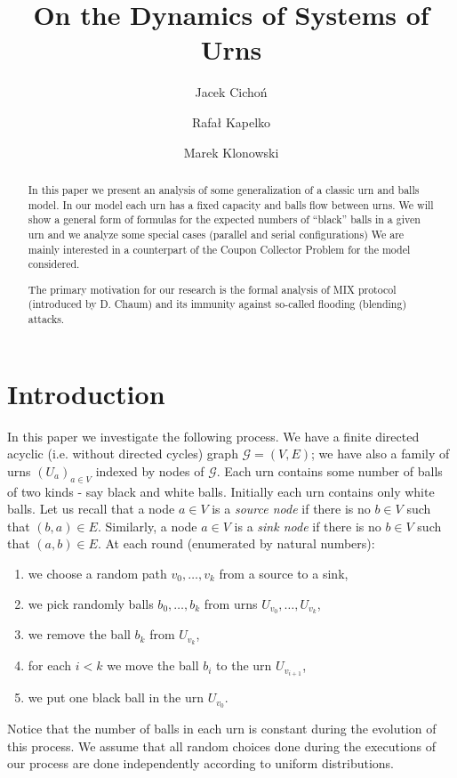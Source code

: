 \documentclass[submission]{dmtcs}
\title{
	On the Dynamics of Systems of Urns
}
\author{
	Jacek Cicho\'{n} \and 
	Rafa{\l} Kapelko \and 
	Marek Klonowski
}
\newcommand{\Marek} [1]{\marginpar{\scriptsize {\bf MKlo}:#1}}
\begin{document}
\maketitle

\begin{abstract}
In this paper we present an analysis of some generalization of a classic 
urn and balls model. In our model each urn has a fixed capacity 
and balls flow between urns. 
We will show a general form of formulas for the expected numbers of ``black'' balls in a 
given urn and we analyze some special cases (parallel and serial configurations)
We are mainly interested in a counterpart of the Coupon Collector Problem 
for the model considered. 

The primary motivation for our research is the formal analysis of  MIX protocol (introduced by D. Chaum) 
and its immunity against so-called flooding (blending) attacks. 
\end{abstract}


\section{Introduction}

In this paper we investigate the following process. We have a finite directed 
acyclic (i.e. without directed cycles) graph  $\mathcal{G} = (V,E)$; we have also a family of urns 
$(U_a)_{a \in V}$ indexed by nodes of  $\mathcal{G}$. 
Each urn contains some number of balls of two kinds - say black and white balls.  
Initially each urn contains only white balls. 
Let us recall that a node $a\in V$ is a \textit{source node} if there is no $b\in V$
such that $(b,a) \in E$. Similarly, a node $a\in V$ is a \textit{sink node} 
if there is no $b\in V$ such that $(a,b) \in E$.
At each round (enumerated by natural numbers): 
\begin{enumerate}
\item we choose a random path $v_0,\ldots,v_k$ from a source to a sink, 
\item we pick randomly balls $b_0, \ldots, b_k$ from urns $U_{v_0}, \ldots, U_{v_k}$, 
\item we remove the ball  $b_k$ from $U_{v_k}$,
\item for each $i<k$ we move the ball $b_i$ to the urn  $U_{v_{i+1}}$,
\item we put one black ball in the urn $U_{v_0}$.
\end{enumerate}
Notice that the number of balls in each urn is constant during the evolution
of this process. We assume that all 
random choices done during the executions of our process are  done independently 
according to uniform distributions.
\end{document}
